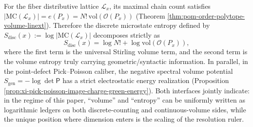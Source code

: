 \begin{remark}\label{rem:xi-discrete-continuous-volume-entropy-splitting}
For the fiber distributive lattice \(\mathcal L_x\), its maximal chain count satisfies
\(
|\mathrm{MC}(\mathcal L_x)|=e(P_x)=N!\,\mathrm{vol}(\mathcal O(P_x))
\)
(Theorem \ref{thm:pom-order-polytope-volume-linext}).
Therefore the discrete microstate entropy defined by
\(
S_{\mathrm{disc}}(x):=\log|\mathrm{MC}(\mathcal L_x)|
\)
decomposes strictly as
\[
S_{\mathrm{disc}}(x)=\log N!+\log \mathrm{vol}(\mathcal O(P_x)),
\]
where the first term is the universal Stirling volume term, and the second term is the volume entropy truly carrying geometric/syntactic information.
In parallel, in the point-defect Pick--Poisson caliber, the negative spectral volume potential
\(
S_{\mathrm{gen}}=-\log\det\mathsf P
\)
has a strict electrostatic energy realization (Proposition \ref{prop:xi-pick-poisson-image-charge-green-energy}).
Both interfaces jointly indicate: in the regime of this paper, ``volume'' and ``entropy'' can be uniformly written as logarithmic ledgers on both discrete-counting and continuous-volume sides, while the unique position where dimension enters is the scaling of the resolution ruler.
\end{remark}



